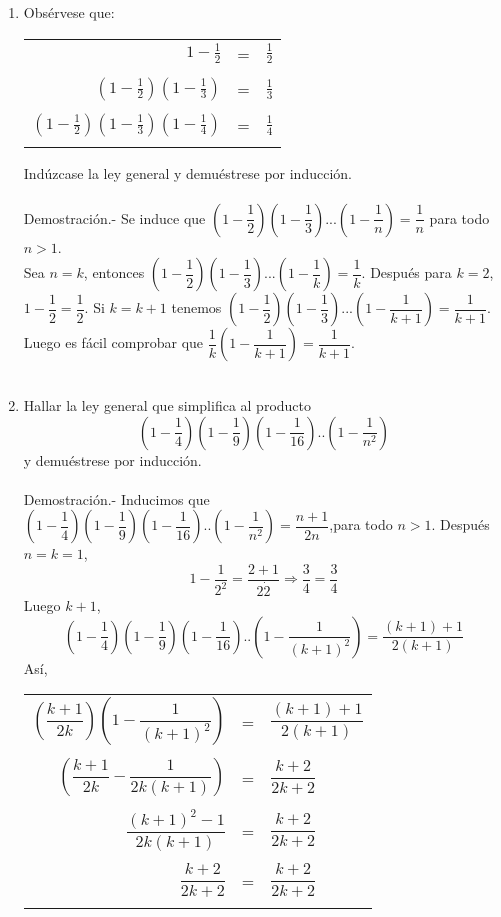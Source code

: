 \begin{enumerate}
\item Obsérvese que:
\begin{center}
\begin{tabular}{r c l}
$1-\frac{1}{2}$&=&$\frac{1}{2}$\\\\
$(1-\frac{1}{2})(1-\frac{1}{3})$&=&$\frac{1}{3}$\\\\
$(1-\frac{1}{2})(1-\frac{1}{3})(1-\frac{1}{4})$&=&$\frac{1}{4}$\\\\
\end{tabular}
\end{center}
Indúzcase la ley general y demuéstrese por inducción.\\\\
Demostración.- \; Se induce que $\left( 1-\dfrac{1}{2} \right)\left( 1-\dfrac{1}{3} \right)...\left(1- \dfrac{1}{n} \right)=\dfrac{1}{n}$ para todo $n>1$.\\
Sea $n=k$, entonces $\left( 1-\dfrac{1}{2} \right)\left( 1-\dfrac{1}{3} \right)...\left(1- \dfrac{1}{k} \right)=\dfrac{1}{k}$. Después para $k=2$, \; $1-\dfrac{1}{2}=\dfrac{1}{2}$. Si $k=k+1$ tenemos $\left( 1-\dfrac{1}{2} \right) \left( 1-\dfrac{1}{3} \right)...\left(1- \dfrac{1}{k+1} \right)=\dfrac{1}{k+1}$. Luego es fácil comprobar que 
$\dfrac{1}{k}\left(1 - \dfrac{1}{k+1} \right)=\dfrac{1}{k+1}$. \\\\

\item Hallar la ley general que simplifica al producto $$\left( 1-\dfrac{1}{4} \right)\left( 1-\dfrac{1}{9} \right)\left( 1- \dfrac{1}{16} \right)..\left( 1- \dfrac{1}{n^2} \right)$$ y demuéstrese por inducción.\\\\
Demostración.- \; Inducimos que $\left( 1-\dfrac{1}{4} \right)\left( 1-\dfrac{1}{9} \right)\left( 1- \dfrac{1}{16} \right)..\left( 1- \dfrac{1}{n^2} \right)=\dfrac{n+1}{2n}$,para todo $n>1$. Después $n=k=1$, $$1-\dfrac{1}{2^2}=\dfrac{2+1}{2\dot 2} \Rightarrow \dfrac{3}{4}=\dfrac{3}{4}$$ 
Luego $k+1$, $$\left( 1-\dfrac{1}{4} \right)\left( 1-\dfrac{1}{9} \right)\left( 1- \dfrac{1}{16} \right)..\left( 1- \dfrac{1}{(k+1)^2} \right)=\dfrac{(k+1)+1}{2(k+1)}$$
Así,
\begin{center}
\begin{tabular}{r c l}
$\left( \dfrac{k+1}{2k}\right) \left( 1- \dfrac{1}{(k+1)^2} \right)$&=&$\dfrac{(k+1)+1}{2(k+1)}$\\\\
$\left( \dfrac{k+1}{2k} - \dfrac{1}{2k(k+1)} \right)$&=&$\dfrac{k+2}{2k+2}$\\\\
$\dfrac{(k+1)^2-1}{2k(k+1)}$&=&$\dfrac{k+2}{2k+2}$\\\\
$\dfrac{k+2}{2k+2}$&=&$\dfrac{k+2}{2k+2}$\\\\
\end{tabular}
\end{center}


\end{enumerate}
